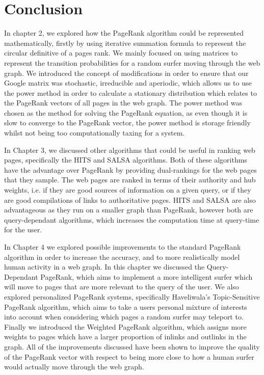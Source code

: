 \documentclass[11pt]{report}
\begin{document}
\chapter{Conclusion} \label{chap:Conclusion}
In chapter 2, we explored how the PageRank algorithm could be represented mathematically, firstly by using iterative summation formula to represent the circular definitive of a pages rank. We mainly focused on using matrices to represent the transition probabilities for a random surfer moving through the web graph. We introduced the concept of modifications in order to ensure that our Google matrix was stochastic, irreducible and aperiodic, which allows us to use the power method in order to calculate a stationary distribution which relates to the PageRank vectors of all pages in the web graph. The power method was chosen as the method for solving the PageRank equation, as even though it is slow to converge to the PageRank vector, the power method is storage friendly whilst not being too computationally taxing for a system. 

In Chapter 3, we discussed other algorithms that could be useful in ranking web pages, specifically the HITS and SALSA algorithms. Both of these algorithms have the advantage over PageRank by providing dual-rankings for the web pages that they sample. The web pages are ranked in terms of their authority and hub weights, i.e. if they are good sources of information on a given query, or if they are good compilations of links to authoritative pages. HITS and SALSA are also advantageous as they run on a smaller graph than PageRank, however both are query-dependant algorithms, which increases the computation time at query-time for the user. 

In Chapter 4 we explored possible improvements to the standard PageRank algorithm in order to increase the accuracy, and to more realistically model human activity in a web graph. In this chapter we discussed the Query-Dependant PageRank, which aims to implement a more intelligent surfer which will move to pages that are more relevant to the query of the user. We also explored personalized PageRank systems, specifically Haveliwala's Topic-Sensitive PageRank algorithm, which aims to take a users personal mixture of interests into account when considering which pages a random surfer may teleport to. Finally we introduced the Weighted PageRank algorithm, which assigns more weights to pages which have a larger proportion of inlinks and outlinks in the graph. All of the improvements discussed have been shown to improve the quality of the PageRank vector with respect to being more close to how a human surfer would actually move through the web graph.
\end{document}
